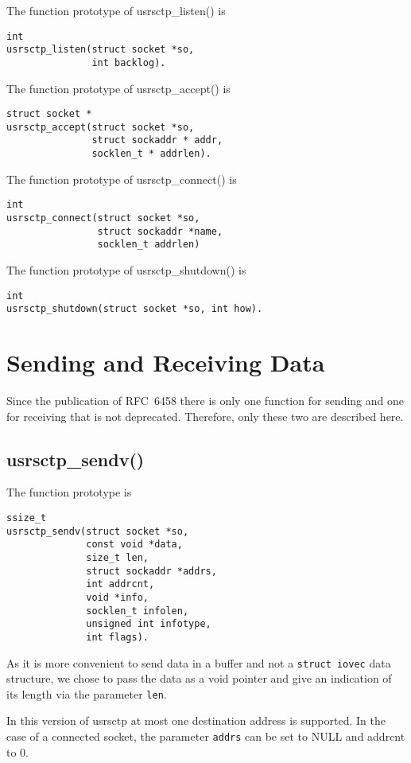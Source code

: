 \documentclass[a4paper]{article}
\begin{document}
The function prototype of usrsctp\_listen() is 
\begin{verbatim}
int
usrsctp_listen(struct socket *so,
               int backlog).
 \end{verbatim}      

The function prototype of usrsctp\_accept() is 
\begin{verbatim}                
struct socket *
usrsctp_accept(struct socket *so,
               struct sockaddr * addr,
               socklen_t * addrlen).
 \end{verbatim}
 
The function prototype of usrsctp\_connect() is 
\begin{verbatim}     
int
usrsctp_connect(struct socket *so,
                struct sockaddr *name,
                socklen_t addrlen)
 \end{verbatim}
 
 
The function prototype of usrsctp\_shutdown() is 
\begin{verbatim}   
int
usrsctp_shutdown(struct socket *so, int how).
\end{verbatim}

\section{Sending and Receiving Data}
Since the publication of RFC~6458 there is only one function for sending and one for receiving
that is not deprecated. Therefore, only these two are described here.

\subsection{usrsctp\_sendv()}
The function prototype is
\begin{verbatim}
ssize_t
usrsctp_sendv(struct socket *so,
              const void *data,
              size_t len,
              struct sockaddr *addrs,
              int addrcnt,
              void *info,
              socklen_t infolen,
              unsigned int infotype,
              int flags).
\end{verbatim}
As it is more convenient to send data in a buffer and not a \texttt{struct iovec} data structure, we
chose to pass the data as a void pointer and give an indication of its length via the parameter 
\texttt{len}. 

In this version of usrsctp at most one destination address is supported. In the case of a connected
socket, the parameter \texttt{addrs} can be set to NULL and addrcnt to 0.
\end{document}
